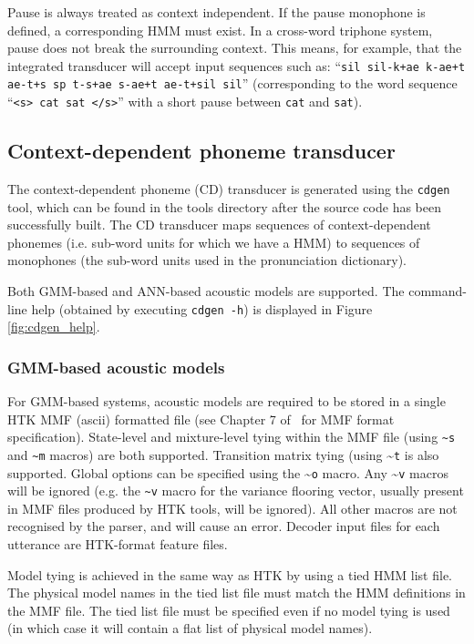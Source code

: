 \documentclass[a4paper,12pt]{report}
\begin{document}
Pause is always treated as context independent. If the pause monophone is defined, a corresponding HMM must exist. In a cross-word triphone system, pause does not break the surrounding context. This means, for example, that the integrated transducer will accept input sequences such as: ``{\tt sil sil-k+ae k-ae+t ae-t+s sp t-s+ae s-ae+t ae-t+sil sil}'' (corresponding to the word sequence ``{\tt <s> cat sat </s>}'' with a short pause between {\tt cat} and {\tt sat}). 


\subsection{Context-dependent phoneme transducer}
\label{sec:cdgen}

The context-dependent phoneme (CD) transducer is generated using the {\tt cdgen} tool, which can be found in the tools directory after the source code has been successfully built. The CD transducer maps sequences of context-dependent phonemes (i.e. sub-word units for which we have a HMM) to sequences of monophones (the sub-word units used in the pronunciation dictionary).

Both GMM-based and ANN-based acoustic models are supported. The command-line help (obtained by executing {\tt cdgen -h}) is displayed in Figure \ref{fig:cdgen_help}. 

\subsubsection{GMM-based acoustic models}

For GMM-based systems, acoustic models are required to be stored in a single HTK MMF (ascii) formatted file (see Chapter 7 of~\cite{htkbook321} for MMF format specification). State-level and mixture-level tying within the MMF file (using {\tt {\textasciitilde}s} and {\tt {\textasciitilde}m} macros) are both supported. Transition matrix tying (using {\textasciitilde}{\tt t} is also supported. Global options can be specified using the {\textasciitilde}{\tt o} macro. Any {\textasciitilde}{\tt v} macros will be ignored (e.g. the {\tt {\textasciitilde}v} macro for the variance flooring vector, usually present in MMF files produced by HTK tools, will be ignored). All other macros are not recognised by the parser, and will cause an error. Decoder input files for each utterance are HTK-format feature files.

Model tying is achieved in the same way as HTK by using a tied HMM list file. The physical model names in the tied list file must match the HMM definitions in the MMF file. The tied list file must be specified even if no model tying is used (in which case it will contain a flat list of physical model names).
\end{document}
